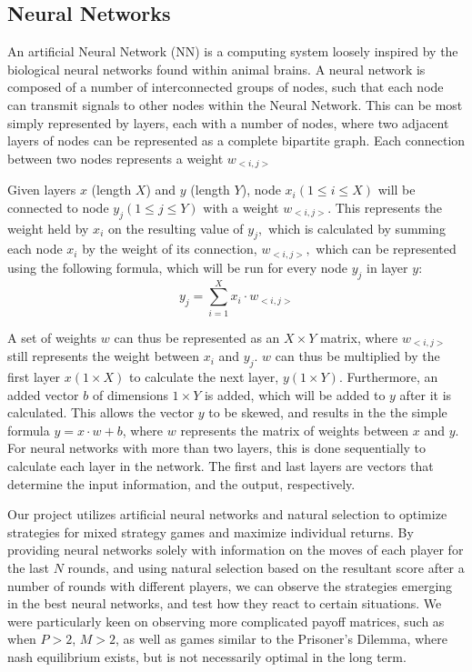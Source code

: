 \documentclass{article}
\begin{document}
\subsection{Neural Networks}
An artificial Neural Network (NN) is a computing system loosely inspired by the biological neural networks found within animal brains. A neural network is composed of a number of interconnected groups of nodes, such that each node can transmit signals to other nodes within the Neural Network. This can be most simply represented by layers, each with a number of nodes, where two adjacent layers of nodes can be represented as a complete bipartite graph. Each connection between two nodes represents a weight $w_{<i,j>}$

Given layers $x$ (length $X$) and $y$ (length $Y$), node $x_i(1\leq i \leq X)$ will be connected to node $y_j (1\leq j \leq Y)$ with a weight $w_{<i,j>}$. This represents the weight held by $x_i$ on the resulting value of $y_j,$ which is calculated by summing each node $x_i$ by the weight of its connection, $w_{<i,j>},$ which can be represented using the following formula, which will be run for every node $y_j$ in layer $y$: $$y_j=\sum_{i=1}^X x_i\cdot w_{<i,j>}$$

A set of weights $w$ can thus be represented as an $X\times Y$ matrix, where $w_{<i,j>}$ still represents the weight between $x_i$ and $y_j$. $w$ can thus be multiplied by the first layer $x (1\times X)$ to calculate the next layer, $y (1\times Y)$. Furthermore, an added vector $b$ of dimensions $1\times Y$ is added, which will be added to $y$ after it is calculated. This allows the vector $y$ to be skewed, and results in the the simple formula $y = x\cdot w+b$, where $w$ represents the matrix of weights between $x$ and $y$. For neural networks with more than two layers, this is done sequentially to calculate each layer in the network. The first and last layers are vectors that determine the input information, and the output, respectively.

Our project utilizes artificial neural networks and natural selection to optimize strategies for mixed strategy games and maximize individual returns. By providing neural networks solely with information on the moves of each player for the last $N$ rounds, and using natural selection based on the resultant score after a number of rounds with different players, we can observe the strategies emerging in the best neural networks, and test how they react to certain situations. We were particularly keen on observing more complicated payoff matrices, such as when $P>2$, $M>2$, as well as games similar to the Prisoner's Dilemma, where nash equilibrium exists, but is not necessarily optimal in the long term.
\end{document}
